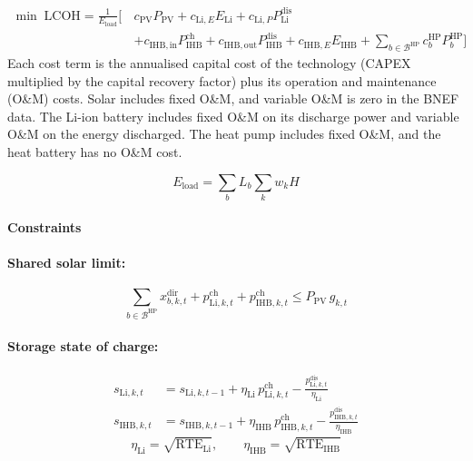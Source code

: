 \documentclass[11pt]{article}
\newcommand{\Li}{\mathrm{Li}}
\newcommand{\IHB}{\mathrm{IHB}}
\newcommand{\HP}{\mathrm{HP}}
\newcommand{\PV}{\mathrm{PV}}
\newcommand{\ch}{\mathrm{ch}}
\newcommand{\dis}{\mathrm{dis}}
\newcommand{\Eload}{E_{\mathrm{load}}}
\begin{document}
\begin{equation}
\begin{split}
\min\; \mathrm{LCOH} = \frac{1}{\Eload}\Big[\, & c_{\PV}P_{\PV} + c_{\Li,E}E_{\Li} + c_{\Li,P}P_{\Li}^{\dis} \\
 & + c_{\IHB,\mathrm{in}}P_{\IHB}^{\ch} + c_{\IHB,\mathrm{out}}P_{\IHB}^{\dis} + c_{\IHB,E}E_{\IHB} + \sum_{b \in \mathcal{B}^{\HP}} c_{b}^{\HP}P_{b}^{\HP} \Big]
\end{split}
\label{eq:objective}
\end{equation}
Each cost term is the annualised capital cost of the technology (CAPEX multiplied by the capital recovery factor) plus its operation and maintenance (O\&M) costs. Solar includes fixed O\&M, and variable O\&M is zero in the BNEF data. The Li-ion battery includes fixed O\&M on its discharge power and variable O\&M on the energy discharged. The heat pump includes fixed O\&M, and the heat battery has no O\&M cost.

\begin{equation}
\Eload = \sum_{b} L_{b}\sum_{k} w_{k}H
\label{eq:eload}
\end{equation}

\paragraph*{Constraints}

\paragraph{Shared solar limit:}
\begin{equation}
\sum_{b \in \mathcal{B}^{\HP}} x_{b,k,t}^{\mathrm{dir}} + p_{\Li,k,t}^{\ch} + p_{\IHB,k,t}^{\ch} \leq P_{\PV}\, g_{k,t}
\label{eq:solar}
\end{equation}

\paragraph{Storage state of charge:}
\begin{align}
s_{\Li,k,t}  &= s_{\Li,k,t-1} + \eta_{\Li}\, p_{\Li,k,t}^{\ch} - \frac{p_{\Li,k,t}^{\dis}}{\eta_{\Li}} \label{eq:soc-li}\\
s_{\IHB,k,t} &= s_{\IHB,k,t-1} + \eta_{\IHB}\, p_{\IHB,k,t}^{\ch} - \frac{p_{\IHB,k,t}^{\dis}}{\eta_{\IHB}} \label{eq:soc-ihb}
\end{align}
\begin{equation}
\eta_{\Li} = \sqrt{\mathrm{RTE}_{\Li}}, \qquad \eta_{\IHB} = \sqrt{\mathrm{RTE}_{\IHB}}
\end{equation}
\end{document}
